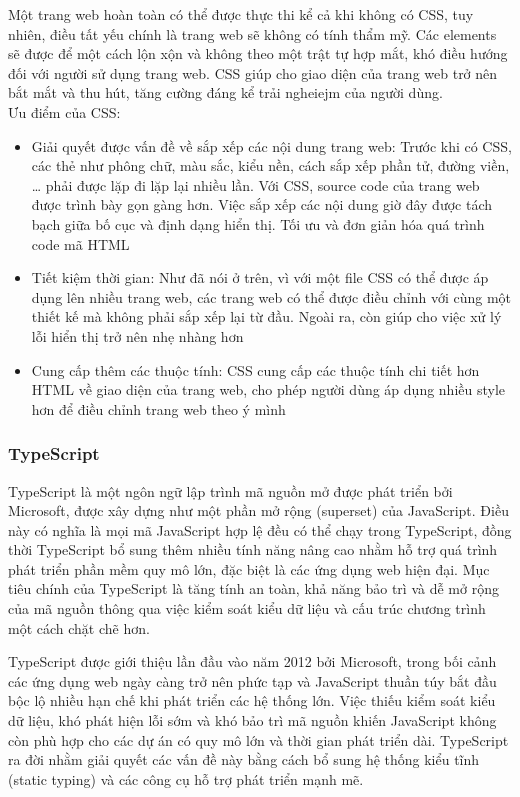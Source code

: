         Một trang web hoàn toàn có thể được thực thi kể cả khi không có CSS, tuy nhiên, điều tất yếu chính là trang web sẽ không có tính thẩm mỹ. Các elements sẽ được để một cách lộn xộn và không theo một trật tự hợp mắt, khó điều hướng đối với người sử dụng trang web. CSS giúp cho giao diện của trang web trở nên bắt mắt và thu hút, tăng cường đáng kể trải ngheiejm của người dùng. \\
        Ưu điểm của CSS:
            \begin{itemize}
                \item Giải quyết được vấn đề về sắp xếp các nội dung trang web: Trước khi có CSS, các thẻ như phông chữ, màu sắc, kiểu nền, cách sắp xếp phần tử, đường viền, … phải được lặp đi lặp lại nhiều lần. Với CSS, source code của trang web được trình bày gọn gàng hơn. Việc sắp xếp các nội dung giờ đây được tách bạch giữa bố cục và định dạng hiển thị. Tối ưu và đơn giản hóa quá trình code mã HTML
                \item Tiết kiệm thời gian: Như đã nói ở trên, vì với một file CSS có thể được áp dụng lên nhiều trang web, các trang web có thể được điều chỉnh với cùng một thiết kế mà không phải sắp xếp lại từ đầu. Ngoài ra, còn giúp cho việc xử lý lỗi hiển thị trở nên nhẹ nhàng hơn
                \item Cung cấp thêm các thuộc tính: CSS cung cấp các thuộc tính chi tiết hơn HTML về giao diện của trang web, cho phép người dùng áp dụng nhiều style hơn để điều chỉnh trang web theo ý mình
            \end{itemize}
\subsubsection{TypeScript}
TypeScript là một ngôn ngữ lập trình mã nguồn mở được phát triển bởi Microsoft, 
được xây dựng như một phần mở rộng (superset) của JavaScript. Điều này có nghĩa 
là mọi mã JavaScript hợp lệ đều có thể chạy trong TypeScript, đồng thời TypeScript 
bổ sung thêm nhiều tính năng nâng cao nhằm hỗ trợ quá trình phát triển phần mềm 
quy mô lớn, đặc biệt là các ứng dụng web hiện đại. Mục tiêu chính của TypeScript 
là tăng tính an toàn, khả năng bảo trì và dễ mở rộng của mã nguồn thông qua việc 
kiểm soát kiểu dữ liệu và cấu trúc chương trình một cách chặt chẽ hơn.

TypeScript được giới thiệu lần đầu vào năm 2012 bởi Microsoft, trong bối cảnh các 
ứng dụng web ngày càng trở nên phức tạp và JavaScript thuần túy bắt đầu bộc lộ 
nhiều hạn chế khi phát triển các hệ thống lớn. Việc thiếu kiểm soát kiểu dữ liệu, 
khó phát hiện lỗi sớm và khó bảo trì mã nguồn khiến JavaScript không còn phù hợp 
cho các dự án có quy mô lớn và thời gian phát triển dài. TypeScript ra đời nhằm 
giải quyết các vấn đề này bằng cách bổ sung hệ thống kiểu tĩnh (static typing) 
và các công cụ hỗ trợ phát triển mạnh mẽ.

